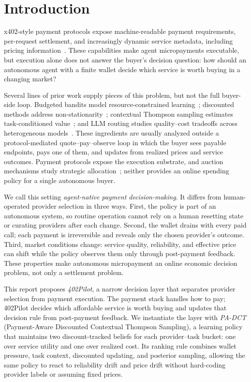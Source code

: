 \documentclass[sigconf, nonacm]{acmart}
\DeclareRobustCommand{\padct}{PA\nobreakdash-DCT}
\begin{document}
\section{Introduction}
\label{sec:intro}

x402-style payment protocols expose machine-readable payment requirements, per-request settlement, and increasingly dynamic service metadata, including pricing information~\citep{coinbase2025x402v2}. These capabilities make agent micropayments executable, but execution alone does not answer the buyer's decision question: how should an autonomous agent with a finite wallet decide which service is worth buying in a changing market?

Several lines of prior work supply pieces of this problem, but not the full buyer-side loop. Budgeted bandits model resource-constrained learning~\citep{xia2015bts,badanidiyuru2018bandits}; discounted methods address non-stationarity~\citep{garivier2011discounted,qi2023dsts}; contextual Thompson sampling estimates task-conditioned value~\citep{agrawal2013contextualts}; and LLM routing studies quality--cost tradeoffs across heterogeneous models~\citep{chen2023frugalgpt,ong2024routellm,ding2024hybridllm,mixllm2024,llmbandit2025}. These ingredients are usually analyzed outside a protocol-mediated quote--pay--observe loop in which the buyer sees payable endpoints, pays one of them, and updates from realized prices and service outcomes. Payment protocols expose the execution substrate, and auction mechanisms study strategic allocation~\citep{patra2026reverseauction}; neither provides an online spending policy for a single autonomous buyer.

We call this setting \emph{agent-native payment decision-making}. It differs from human-operated provider selection in three ways. First, the policy is part of an autonomous system, so routine operation cannot rely on a human resetting state or curating providers after each change. Second, the wallet drains with every paid call; each payment is irreversible and reveals only the chosen provider's outcome. Third, market conditions change: service quality, reliability, and effective price can shift while the policy observes them only through post-payment feedback. These properties make autonomous micropayment an online economic decision problem, not only a settlement problem.

This report proposes \emph{402Pilot}, a narrow decision layer that separates provider selection from payment execution. The payment stack handles how to pay; 402Pilot decides which affordable service is worth buying and updates that decision rule from post-payment feedback. We instantiate the layer with \emph{\padct} (Payment-Aware Discounted Contextual Thompson Sampling), a learning policy that maintains two discount-tracked beliefs for each provider--task bucket: one over service utility and one over realized cost. Its ranking rule combines wallet pressure, task context, discounted updating, and posterior sampling, allowing the same policy to react to reliability drift and price drift without hard-coding provider labels or assuming fixed prices.
\end{document}
